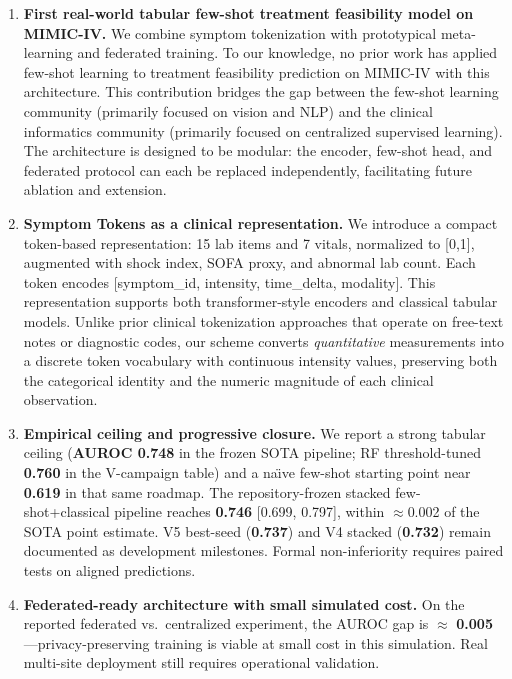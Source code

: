 \begin{enumerate}
\item \textbf{First real-world tabular few-shot treatment feasibility model on MIMIC-IV.} We combine symptom tokenization with prototypical meta-learning and federated training. To our knowledge, no prior work has applied few-shot learning to treatment feasibility prediction on MIMIC-IV with this architecture. This contribution bridges the gap between the few-shot learning community (primarily focused on vision and NLP) and the clinical informatics community (primarily focused on centralized supervised learning). The architecture is designed to be modular: the encoder, few-shot head, and federated protocol can each be replaced independently, facilitating future ablation and extension.

\item \textbf{Symptom Tokens as a clinical representation.} We introduce a compact token-based representation: 15 lab items and 7 vitals, normalized to [0,1], augmented with shock index, SOFA proxy, and abnormal lab count. Each token encodes [symptom\_id, intensity, time\_delta, modality]. This representation supports both transformer-style encoders and classical tabular models. Unlike prior clinical tokenization approaches that operate on free-text notes or diagnostic codes, our scheme converts \emph{quantitative} measurements into a discrete token vocabulary with continuous intensity values, preserving both the categorical identity and the numeric magnitude of each clinical observation.

\item \textbf{Empirical ceiling and progressive closure.} We report a strong tabular ceiling (\textbf{AUROC 0.748} in the frozen SOTA pipeline; RF threshold-tuned \textbf{0.760} in the V-campaign table) and a na\"{\i}ve few-shot starting point near \textbf{0.619} in that same roadmap. The repository-frozen stacked few-shot+classical pipeline reaches \textbf{0.746} [0.699, 0.797], within $\approx$0.002 of the SOTA point estimate. V5 best-seed (\textbf{0.737}) and V4 stacked (\textbf{0.732}) remain documented as development milestones. Formal non-inferiority requires paired tests on aligned predictions.

\item \textbf{Federated-ready architecture with small simulated cost.} On the reported federated vs.\ centralized experiment, the AUROC gap is $\approx$ \textbf{0.005}---privacy-preserving training is viable at small cost in this simulation. Real multi-site deployment still requires operational validation.


\end{enumerate}
